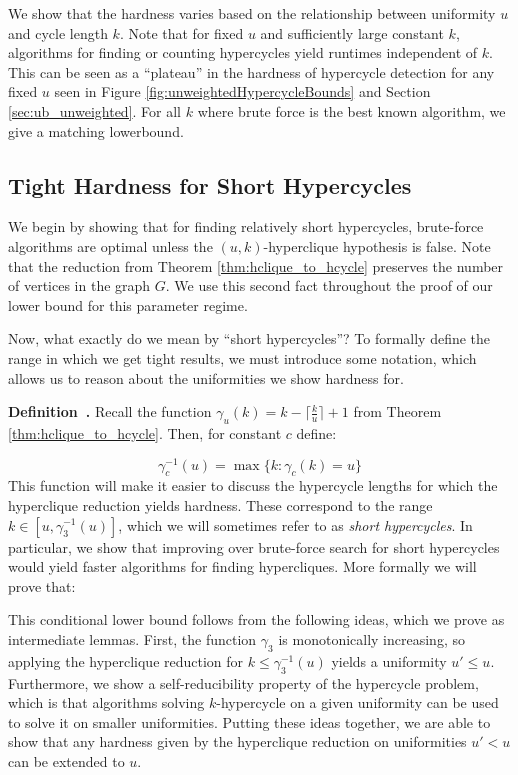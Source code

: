 \documentclass[11pt,letterpaper,pdftex]{article}
\newcounter{definition}
\newenvironment{definition}[1][]{\refstepcounter{definition}\par\medskip
   \noindent \textbf{Definition~\thedefinition. #1} \rmfamily}{\medskip}
\begin{document}
We show that the hardness varies based on the relationship between uniformity $u$ and cycle length $k$.
Note that for fixed $u$ and sufficiently large constant $k$, algorithms for finding or counting hypercycles yield runtimes independent of $k$.
This can be seen as a ``plateau'' in the hardness of hypercycle detection for any fixed $u$ seen in Figure \ref{fig:unweightedHypercycleBounds} and Section \ref{sec:ub_unweighted}.
For all $k$ where brute force is the best known algorithm, we give a matching lowerbound.



\subsection{Tight Hardness for Short Hypercycles}
\label{subsec:tighthardnessshorthypercycles}

We begin by showing that for finding relatively short hypercycles, brute-force algorithms are optimal unless the $(u,k)$-hyperclique hypothesis is false.
Note that the reduction from Theorem \ref{thm:hclique_to_hcycle} preserves the number of vertices in the graph $G$.
We use this second fact throughout the proof of our lower bound for this parameter regime.


Now, what exactly do we mean by ``short hypercycles''? 
To formally define the range in which we get tight results, we must introduce some notation, which allows us to reason about the uniformities we show hardness for.

\begin{definition}
    Recall the function $\gamma_u(k)=k-\lceil \frac{k}{u} \rceil+1$ from Theorem \ref{thm:hclique_to_hcycle}.
    Then, for constant $c$ define:
    
    \[\gamma_c^{-1}(u) = \max \{ k : \gamma_c(k) = u\}\]
\end{definition}
This function will make it easier to discuss the hypercycle lengths for which the hyperclique reduction yields hardness.
These correspond to the range $k \in [u, \gamma_3^{-1}(u)]$, which we will sometimes refer to as \textit{short hypercycles}.
In particular, we show that improving over brute-force search for short hypercycles would yield faster algorithms for finding hypercliques.
More formally we will prove that:


\tightShortHypercycle*

This conditional lower bound follows from the following ideas, which we prove as intermediate lemmas.
First, the function $\gamma_3$ is monotonically increasing, so applying the hyperclique reduction for $k\leq \gamma_3^{-1}(u)$ yields a uniformity $u' \leq u$.
Furthermore, we show a self-reducibility property of the hypercycle problem, which is that algorithms solving $k$-hypercycle on a given uniformity can be used to solve it on smaller uniformities.
Putting these ideas together, we are able to show that any hardness given by the hyperclique reduction on uniformities $u'<u$ can be extended to $u$.
\end{document}
